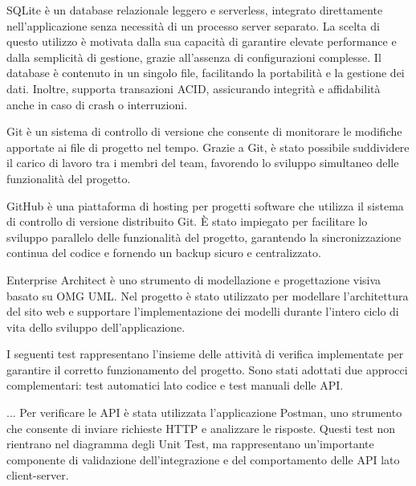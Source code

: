 \documentclass[a4paper]{report}
\begin{document}
SQLite è un database relazionale leggero e serverless, integrato direttamente nell'applicazione senza necessità di un processo server separato. La scelta di questo utilizzo è motivata dalla sua capacità di garantire elevate performance e dalla semplicità di gestione, grazie all'assenza di configurazioni complesse. Il database è contenuto in un singolo file, facilitando la portabilità e la gestione dei dati. Inoltre, supporta transazioni ACID, assicurando integrità e affidabilità anche in caso di crash o interruzioni.


Git è un sistema di controllo di versione che consente di monitorare le modifiche apportate ai file di progetto nel tempo. Grazie a Git, è stato possibile suddividere il carico di lavoro tra i membri del team, favorendo lo sviluppo simultaneo delle funzionalità del progetto.

GitHub è una piattaforma di hosting per progetti software che utilizza il sistema di controllo di
versione distribuito Git. È stato impiegato per facilitare lo sviluppo parallelo delle funzionalità
del progetto, garantendo la sincronizzazione continua del codice e fornendo un backup sicuro e
centralizzato.

Enterprise Architect è uno strumento di modellazione e progettazione visiva basato su OMG UML. Nel progetto è stato utilizzato per modellare l’architettura del sito web e supportare l’implementazione dei modelli durante l’intero ciclo di vita dello sviluppo dell’applicazione.



\clearpage
{}

\clearpage
{}
I seguenti test rappresentano l’insieme delle attività di verifica implementate per garantire il corretto funzionamento del progetto. Sono stati adottati due approcci complementari: test automatici lato codice e test manuali delle API.

...
Per verificare le API è stata utilizzata l’applicazione Postman, uno strumento che consente di inviare richieste HTTP e analizzare le risposte. Questi test non rientrano nel diagramma degli Unit Test, ma rappresentano un'importante componente di validazione dell’integrazione e del comportamento delle API lato client-server.

\clearpage
{}
\end{document}
